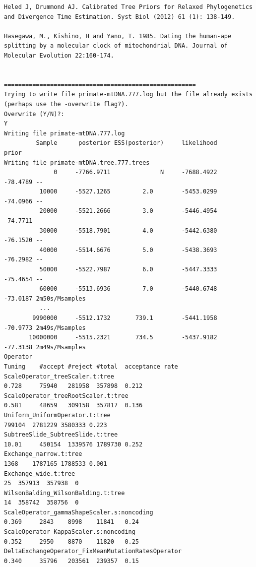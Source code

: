 \documentclass[11pt]{article}
\theoremstyle{plain}%
\theoremstyle{definition}
\theoremstyle{remark}
\begin{document}
{\begin{verbatim}
Heled J, Drummond AJ. Calibrated Tree Priors for Relaxed Phylogenetics and Divergence Time Estimation. Syst Biol (2012) 61 (1): 138-149.

Hasegawa, M., Kishino, H and Yano, T. 1985. Dating the human-ape splitting by a molecular clock of mitochondrial DNA. Journal of Molecular Evolution 22:160-174.


======================================================
Trying to write file primate-mtDNA.777.log but the file already exists (perhaps use the -overwrite flag?).
Overwrite (Y/N)?:
Y
Writing file primate-mtDNA.777.log
         Sample      posterior ESS(posterior)     likelihood          prior
Writing file primate-mtDNA.tree.777.trees
              0     -7766.9711              N     -7688.4922       -78.4789 --
          10000     -5527.1265         2.0        -5453.0299       -74.0966 --
          20000     -5521.2666         3.0        -5446.4954       -74.7711 --
          30000     -5518.7901         4.0        -5442.6380       -76.1520 --
          40000     -5514.6676         5.0        -5438.3693       -76.2982 --
          50000     -5522.7987         6.0        -5447.3333       -75.4654 --
          60000     -5513.6936         7.0        -5440.6748       -73.0187 2m50s/Msamples
          ...
        9990000     -5512.1732       739.1        -5441.1958       -70.9773 2m49s/Msamples
       10000000     -5515.2321       734.5        -5437.9182       -77.3138 2m49s/Msamples
Operator                                                              Tuning	#accept	#reject	#total	acceptance rate
ScaleOperator_treeScaler.t:tree                                       0.728 	75940	281958	357898	0.212 
ScaleOperator_treeRootScaler.t:tree                                   0.581 	48659	309158	357817	0.136 
Uniform_UniformOperator.t:tree                                              	799104	2781229	3580333	0.223 
SubtreeSlide_SubtreeSlide.t:tree                                      10.01 	450154	1339576	1789730	0.252 
Exchange_narrow.t:tree                                                      	1368	1787165	1788533	0.001 
Exchange_wide.t:tree                                                        	25	357913	357938	0 
WilsonBalding_WilsonBalding.t:tree                                          	14	358742	358756	0 
ScaleOperator_gammaShapeScaler.s:noncoding                            0.369 	2843	8998	11841	0.24 
ScaleOperator_KappaScaler.s:noncoding                                 0.352 	2950	8870	11820	0.25 
DeltaExchangeOperator_FixMeanMutationRatesOperator                    0.340 	35796	203561	239357	0.15 

\end{verbatim}}
\end{document}
